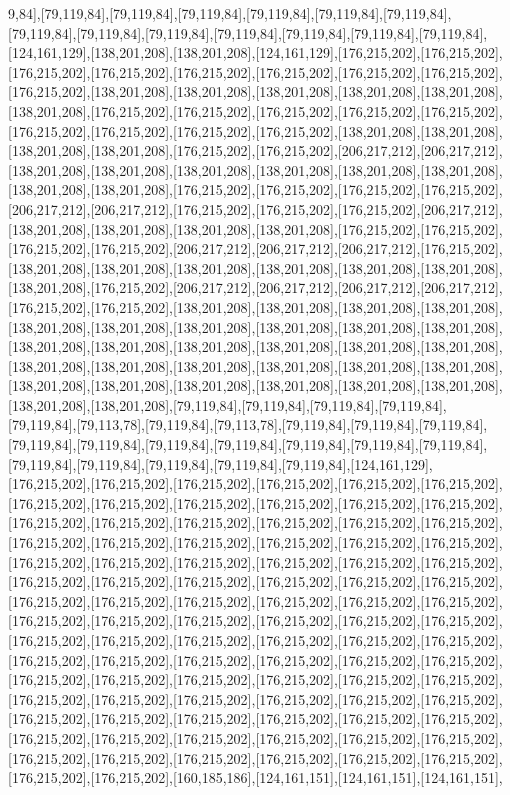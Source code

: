 9,84],[79,119,84],[79,119,84],[79,119,84],[79,119,84],[79,119,84],[79,119,84],[79,119,84],[79,119,84],[79,119,84],[79,119,84],[79,119,84],[79,119,84],[79,119,84],[124,161,129],[138,201,208],[138,201,208],[124,161,129],[176,215,202],[176,215,202],[176,215,202],[176,215,202],[176,215,202],[176,215,202],[176,215,202],[176,215,202],[176,215,202],[138,201,208],[138,201,208],[138,201,208],[138,201,208],[138,201,208],[138,201,208],[176,215,202],[176,215,202],[176,215,202],[176,215,202],[176,215,202],[176,215,202],[176,215,202],[176,215,202],[176,215,202],[138,201,208],[138,201,208],[138,201,208],[138,201,208],[176,215,202],[176,215,202],[206,217,212],[206,217,212],[138,201,208],[138,201,208],[138,201,208],[138,201,208],[138,201,208],[138,201,208],[138,201,208],[138,201,208],[176,215,202],[176,215,202],[176,215,202],[176,215,202],[206,217,212],[206,217,212],[176,215,202],[176,215,202],[176,215,202],[206,217,212],[138,201,208],[138,201,208],[138,201,208],[138,201,208],[176,215,202],[176,215,202],[176,215,202],[176,215,202],[206,217,212],[206,217,212],[206,217,212],[176,215,202],[138,201,208],[138,201,208],[138,201,208],[138,201,208],[138,201,208],[138,201,208],[138,201,208],[176,215,202],[206,217,212],[206,217,212],[206,217,212],[206,217,212],[176,215,202],[176,215,202],[138,201,208],[138,201,208],[138,201,208],[138,201,208],[138,201,208],[138,201,208],[138,201,208],[138,201,208],[138,201,208],[138,201,208],[138,201,208],[138,201,208],[138,201,208],[138,201,208],[138,201,208],[138,201,208],[138,201,208],[138,201,208],[138,201,208],[138,201,208],[138,201,208],[138,201,208],[138,201,208],[138,201,208],[138,201,208],[138,201,208],[138,201,208],[138,201,208],[138,201,208],[138,201,208],[79,119,84],[79,119,84],[79,119,84],[79,119,84],[79,119,84],[79,113,78],[79,119,84],[79,113,78],[79,119,84],[79,119,84],[79,119,84],[79,119,84],[79,119,84],[79,119,84],[79,119,84],[79,119,84],[79,119,84],[79,119,84],[79,119,84],[79,119,84],[79,119,84],[79,119,84],[79,119,84],[124,161,129],[176,215,202],[176,215,202],[176,215,202],[176,215,202],[176,215,202],[176,215,202],[176,215,202],[176,215,202],[176,215,202],[176,215,202],[176,215,202],[176,215,202],[176,215,202],[176,215,202],[176,215,202],[176,215,202],[176,215,202],[176,215,202],[176,215,202],[176,215,202],[176,215,202],[176,215,202],[176,215,202],[176,215,202],[176,215,202],[176,215,202],[176,215,202],[176,215,202],[176,215,202],[176,215,202],[176,215,202],[176,215,202],[176,215,202],[176,215,202],[176,215,202],[176,215,202],[176,215,202],[176,215,202],[176,215,202],[176,215,202],[176,215,202],[176,215,202],[176,215,202],[176,215,202],[176,215,202],[176,215,202],[176,215,202],[176,215,202],[176,215,202],[176,215,202],[176,215,202],[176,215,202],[176,215,202],[176,215,202],[176,215,202],[176,215,202],[176,215,202],[176,215,202],[176,215,202],[176,215,202],[176,215,202],[176,215,202],[176,215,202],[176,215,202],[176,215,202],[176,215,202],[176,215,202],[176,215,202],[176,215,202],[176,215,202],[176,215,202],[176,215,202],[176,215,202],[176,215,202],[176,215,202],[176,215,202],[176,215,202],[176,215,202],[176,215,202],[176,215,202],[176,215,202],[176,215,202],[176,215,202],[176,215,202],[176,215,202],[176,215,202],[176,215,202],[176,215,202],[176,215,202],[176,215,202],[176,215,202],[176,215,202],[160,185,186],[124,161,151],[124,161,151],[124,161,151],